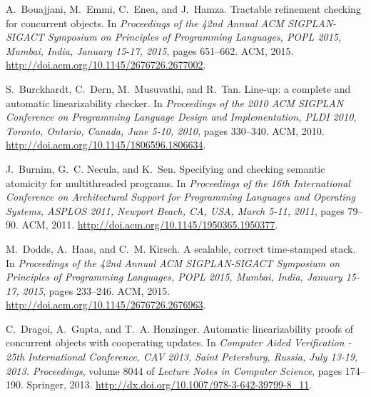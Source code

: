 \documentclass[9pt,natbib,authoryear]{sigplanconf}
\begin{document}
\begin{thebibliography}{26}
A.~Bouajjani, M.~Emmi, C.~Enea, and J.~Hamza.
\newblock Tractable refinement checking for concurrent objects.
\newblock In \emph{Proceedings of the 42nd Annual {ACM} {SIGPLAN-SIGACT}
  Symposium on Principles of Programming Languages, {POPL} 2015, Mumbai, India,
  January 15-17, 2015}, pages 651--662. {ACM}, 2015{}.
\newblock \url{http://doi.acm.org/10.1145/2676726.2677002}.

S.~Burckhardt, C.~Dern, M.~Musuvathi, and R.~Tan.
\newblock Line-up: a complete and automatic linearizability checker.
\newblock In \emph{Proceedings of the 2010 {ACM} {SIGPLAN} Conference on
  Programming Language Design and Implementation, {PLDI} 2010, Toronto,
  Ontario, Canada, June 5-10, 2010}, pages 330--340. {ACM}, 2010.
\newblock \url{http://doi.acm.org/10.1145/1806596.1806634}.

J.~Burnim, G.~C. Necula, and K.~Sen.
\newblock Specifying and checking semantic atomicity for multithreaded
  programs.
\newblock In \emph{Proceedings of the 16th International Conference on
  Architectural Support for Programming Languages and Operating Systems,
  {ASPLOS} 2011, Newport Beach, CA, USA, March 5-11, 2011}, pages 79--90.
  {ACM}, 2011.
\newblock \url{http://doi.acm.org/10.1145/1950365.1950377}.

M.~Dodds, A.~Haas, and C.~M. Kirsch.
\newblock A scalable, correct time-stamped stack.
\newblock In \emph{Proceedings of the 42nd Annual {ACM} {SIGPLAN-SIGACT}
  Symposium on Principles of Programming Languages, {POPL} 2015, Mumbai, India,
  January 15-17, 2015}, pages 233--246. {ACM}, 2015.
\newblock \url{http://doi.acm.org/10.1145/2676726.2676963}.

C.~Dragoi, A.~Gupta, and T.~A. Henzinger.
\newblock Automatic linearizability proofs of concurrent objects with
  cooperating updates.
\newblock In \emph{Computer Aided Verification - 25th International Conference,
  {CAV} 2013, Saint Petersburg, Russia, July 13-19, 2013. Proceedings}, volume
  8044 of \emph{Lecture Notes in Computer Science}, pages 174--190. Springer,
  2013.
\newblock \url{http://dx.doi.org/10.1007/978-3-642-39799-8_11}.


\end{thebibliography}
\end{document}
